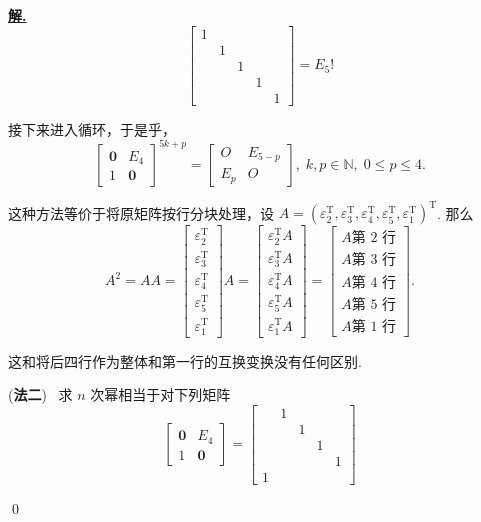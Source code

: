 \documentclass[10pt,openany]{article}
\theoremstyle{thmstyle} %
\theoremstyle{defstyle} %
\theoremstyle{prostyle} %
\theoremstyle{exastyle}
\theoremstyle{remstyle}
\newenvironment{solution}{\par\underline{\textbf{解.}} \;\fangsong}{\qed\par}
\newcommand{\T}{^{\text{T}}}
\begin{document}
\begin{solution}
\[\begin{bmatrix}
	1 & & & & \\
	& 1  & & & \\
	&  & 1 & & \\
	&  & & 1 & \\
	&  & & & 1 
	\end{bmatrix}=E_5! \]
	
	接下来进入循环，于是乎，
	\[ \begin{bmatrix}
		\bm{0} & E_4 \\ 1 & \bm{0}
	\end{bmatrix}^{5k+p}= \begin{bmatrix}
	O & E_{5-p} \\ E_p & O
	\end{bmatrix}, \; k,p \in \mathbb{N}, \; 0 \leq p \leq 4. \]
	
	这种方法等价于将原矩阵按行分块处理，设 \( A=(\varepsilon_2\T,\varepsilon_3\T,\varepsilon_4\T,\varepsilon_5\T,\varepsilon_1\T)\T \). 那么
	\[ A^2=AA= \begin{bmatrix}
		\varepsilon_2\T \\[1ex] \varepsilon_3\T \\[1ex] \varepsilon_4\T \\[1ex] \varepsilon_5\T \\[1ex] \varepsilon_1\T
	\end{bmatrix}A=\begin{bmatrix}
	\varepsilon_2\T A \\[1ex] \varepsilon_3\T A \\[1ex] \varepsilon_4\T A \\[1ex] \varepsilon_5\T A \\[1ex] \varepsilon_1\T A
	\end{bmatrix}=\begin{bmatrix}
	A \text{第 2 行} \\ A \text{第 3 行} \\ A \text{第 4 行} \\ A \text{第 5 行} \\ A \text{第 1 行}
	\end{bmatrix}.  \] 
	
	这和将后四行作为整体和第一行的互换变换没有任何区别.
	
	\vspace{1ex}
	
	(\textbf{法二}) \ 求 \( n \) 次幂相当于对下列矩阵
	\[ \begin{bmatrix}
		\bm{0} & E_4 \\ 1 & \bm{0}
	\end{bmatrix}=\begin{bmatrix}
		& 1  & & & \\
		&  & 1 & & \\
		&  & & 1 & \\
		&  & & & 1 \\
		1 & & & & 
	\end{bmatrix} \]
	

\end{solution}
\end{document}
